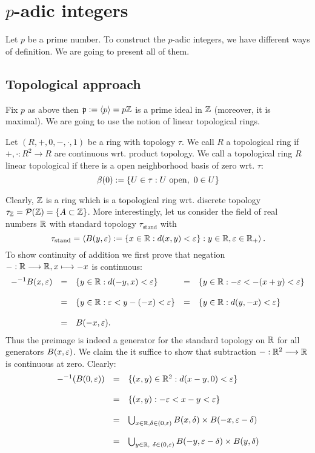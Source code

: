 \section{$p$-adic integers}
Let $p$ be a prime number. To construct the $p$-adic integers, we have different ways of definition. We are going to present all of them.
\subsection{Topological approach}
Fix $p$ as above then $\mathfrak{p} := \left<p\right> = p\zz$ is a prime ideal in $\zz$ (moreover, it is maximal). We are going to use the notion of linear topological rings. 
\begin{defi}
Let $(R,+,0,-,\cdot,1)$ be a ring with topology $\tau$. We call $R$ a topological ring if $+, \cdot : R^2 \longrightarrow R$ are continuous wrt. product topology. We call a topological ring $R$ linear topological if there is a open neighborhood basis of zero wrt. $\tau$:
$$\beta(0) := \{U \in \tau : U\ \trm{open},\ 0 \in U\}$$
\end{defi}
\bsp Clearly, $\zz$ is a ring which is a topological ring wrt. discrete topology $\tau_\zz = \mathcal{P}(\zz) = \{A \subset \zz\}$. More interestingly, let us consider the field of real numbers $\rz$ with standard topology $\tau_{\mathrm{stand}}$ with
$$\tau_{\mathrm{stand}} = \left<B(y,\eps) := \{x \in \rz : d(x,y) < \eps\} : y \in \rz, \eps \in \rz_{+}\right>.$$ To show continuity of addition we first prove that negation $- : \rz \longrightarrow \rz, x \longmapsto -x$ is continuous:
$$\bao{rclcl}
-^{-1} B(x,\eps) &=& \{y \in \rz : d(-y,x) < \eps\} &=& \{y \in \rz : -\eps < -(x + y) < \eps\}\\
&&&&\\
 &=& \{y \in \rz : \eps < y - (-x) < \eps\} &=&  \{y \in \rz : d(y,-x) < \eps\}\\
 &&&&\\ &=& B(-x,\eps).\\
 \ea$$
Thus the preimage is indeed a generator for the standard topology on $\rz$ for all generators $B(x,\eps)$. We claim the it suffice to show that subtraction $- : \rz^2 \longrightarrow \rz$ is continuous at zero. Clearly:
$$\bao{rcl}
-^{-1} (B(0,\eps)) &=& \{(x,y) \in \rz^2 : d(x - y, 0) < \eps\}\\&&\\ &=& \{(x,y) : -\eps < x - y < \eps\}\\
&&\\
& =& \bigcup_{x \in \rz,\delta \in (0,\eps)} B(x,\delta) \times B(-x,\eps - \delta)\\&&\\
&=& \bigcup_{y \in \rz,\ \delta \in (0,\eps)} B(-y,\eps - \delta) \times B(y,\delta)\\
\ea$$
